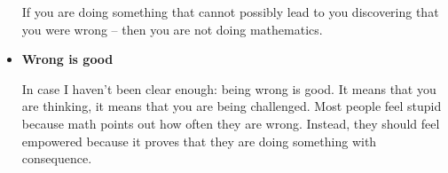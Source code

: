 \begin{itemize}
  If you are doing something that cannot possibly lead to you
  discovering that you were wrong -- then you are not doing
  mathematics.

\item \textbf{Wrong is good}

 In case I haven't been clear enough: being wrong is good.  It means
 that you are thinking, it means that you are being challenged.  Most
 people feel stupid because math points out how often they are wrong.
 Instead, they should feel empowered because it proves that they are
 doing something with consequence.

\end{itemize}










